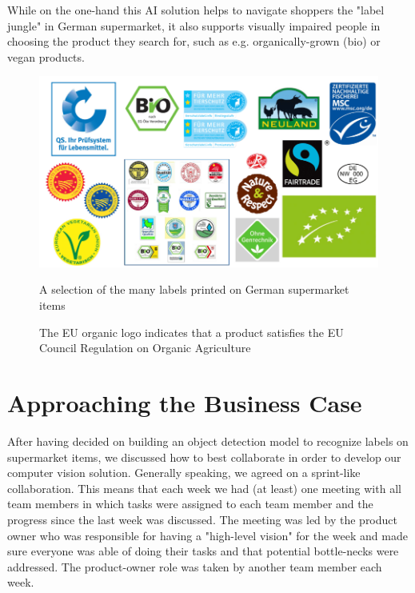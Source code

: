 While on the one-hand this AI solution helps to navigate shoppers the "label jungle" in German supermarket, it also supports visually impaired people in choosing the product they search for, such as e.g. organically-grown (bio) or vegan products. 
\begin{figure}[ht]
\begin{minipage}{.5\textwidth}
  \centering
  \includegraphics[width=\linewidth]{figures/Siegel Lebensmittel.png}
  \caption{A selection of the many labels printed on German supermarket items}
  \label{fig:labels}
\end{minipage}
\hspace{1cm}
\begin{minipage}{.45\textwidth}
  \centering
   
  \caption{The EU organic logo indicates that a product satisfies the EU Council Regulation on Organic Agriculture}
  \label{fig:eu_organic}
\end{minipage}
\end{figure}



\section{Approaching the Business Case}
\label{sec:approach}
After having decided on building an object detection model to recognize labels on supermarket items, we discussed how to best collaborate in order to develop our computer vision solution. Generally speaking, we agreed on a sprint-like collaboration. This means that each week we had (at least) one meeting with all team members in which tasks were assigned to each team member and the progress since the last week was discussed. The meeting was led by the product owner who was responsible for having a "high-level vision" for the week and made sure everyone was able of doing their tasks and that potential bottle-necks were addressed. The product-owner role was taken by another team member each week. 

